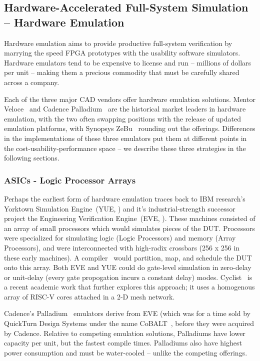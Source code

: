 \subsection{Hardware-Accelerated Full-System Simulation -- Hardware Emulation}

Hardware emulation aims to provide productive full-system verification by
marrying the speed FPGA prototypes with the usability software simulators.
Hardware emulators tend to be expensive to license and run -- millions of
dollars per unit -- making them a precious commodity that must be carefully
shared across a company.

Each of the three major CAD vendors offer hardware emulation solutions.
Mentor Veloce~\cite{Veloce} and Cadence Palladium~\cite{Palladium} are the historical market leaders in
hardware emulation, with the two often swapping positions with the release of updated
emulation platforms, with Synopsys ZeBu~\cite{ZeBu} rounding out the offerings.
Differences in the implementations of these three emulators put them at
different points in the cost-usability-performance space -- we describe these three strategies in the following sections.

\subsubsection{ASICs - Logic Processor Arrays}

Perhaps the earliest form of hardware emulation traces back to IBM research's
Yorktown Simulation Engine~(YUE, \cite{YSEHardware}) and it's industrial-strength successor project
the Engineering Verification Engine~(EVE, \cite{EngineeringVerificationEngine}). These machines consisted of an array
of small processors which would simulates pieces of the DUT. Processors were
specialized for simulating logic (Logic Processors) and memory (Array
Processors), and were interconnected with high-radix crossbars (256 x 256 in
these early machines). A compiler~\cite{YSESoftware} would partition, map, and schedule
the DUT onto this array. Both EVE and YUE could do gate-level simulation in zero-delay
or unit-delay (every gate propogation incurs a constant delay) modes. Cyclist~\cite{Cyclist}
is a recent academic work that further explores this approach; it uses a
homogenous array of RISC-V cores attached in a 2-D mesh network.

Cadence's Palladium~\cite{Palladium} emulators derive from EVE (which was for a time sold by QuickTurn Design Systems under the name CoBALT~\cite{CoBALT}, before they
were acquired by Cadence. Relative to
competing emulation solutions, Palladiums have lower capacity per unit, but the
fastest compile times. Palladiums also have highest power consumption and must be
water-cooled -- unlike the competing offerings.


